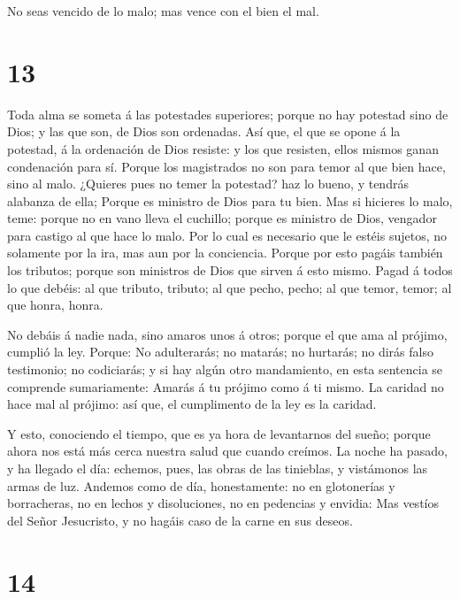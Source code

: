  No seas vencido de lo malo; mas vence con el bien el mal.

\hypertarget{section-12}{%
\section{13}\label{section-12}}

 Toda alma se someta á las potestades superiores; porque no
hay potestad sino de Dios; y las que son, de Dios son ordenadas.
 Así que, el que se opone á la potestad, á la ordenación de
Dios resiste: y los que resisten, ellos mismos ganan condenación para
sí.  Porque los magistrados no son para temor al que bien
hace, sino al malo. ¿Quieres pues no temer la potestad? haz lo bueno, y
tendrás alabanza de ella;  Porque es ministro de Dios para
tu bien. Mas si hicieres lo malo, teme: porque no en vano lleva el
cuchillo; porque es ministro de Dios, vengador para castigo al que hace
lo malo.  Por lo cual es necesario que le estéis sujetos, no
solamente por la ira, mas aun por la conciencia.  Porque por
esto pagáis también los tributos; porque son ministros de Dios que
sirven á esto mismo.  Pagad á todos lo que debéis: al que
tributo, tributo; al que pecho, pecho; al que temor, temor; al que
honra, honra.

 No debáis á nadie nada, sino amaros unos á otros; porque el
que ama al prójimo, cumplió la ley.  Porque: No adulterarás;
no matarás; no hurtarás; no dirás falso testimonio; no codiciarás; y si
hay algún otro mandamiento, en esta sentencia se comprende sumariamente:
Amarás á tu prójimo como á ti mismo.  La caridad no hace
mal al prójimo: así que, el cumplimento de la ley es la caridad.

 Y esto, conociendo el tiempo, que es ya hora de
levantarnos del sueño; porque ahora nos está más cerca nuestra salud que
cuando creímos.  La noche ha pasado, y ha llegado el día:
echemos, pues, las obras de las tinieblas, y vistámonos las armas de
luz.  Andemos como de día, honestamente: no en glotonerías
y borracheras, no en lechos y disoluciones, no en pedencias y envidia:
 Mas vestíos del Señor Jesucristo, y no hagáis caso de la
carne en sus deseos.

\hypertarget{section-13}{%
\section{14}\label{section-13}}


